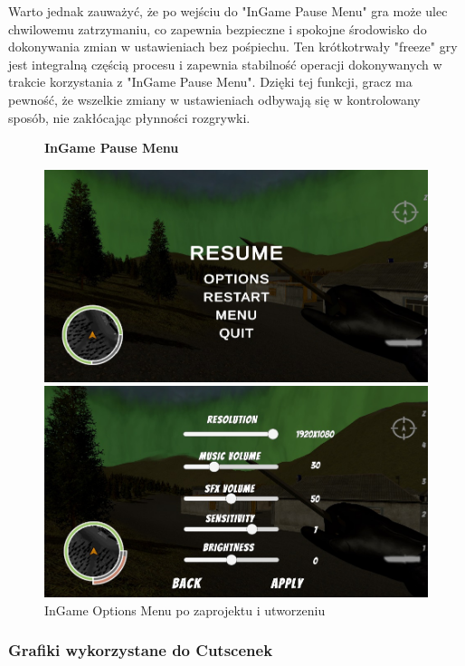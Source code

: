 Warto jednak zauważyć, że po wejściu do "InGame Pause Menu" gra może ulec chwilowemu zatrzymaniu, co zapewnia bezpieczne i spokojne środowisko do dokonywania zmian w ustawieniach bez pośpiechu. Ten krótkotrwały "freeze" gry jest integralną częścią procesu i zapewnia stabilność operacji dokonywanych w trakcie korzystania z "InGame Pause Menu". Dzięki tej funkcji, gracz ma pewność, że wszelkie zmiany w ustawieniach odbywają się w kontrolowany sposób, nie zakłócając płynności rozgrywki.

\begin{figure}[h]
\begin{center}
{\bfseries InGame Pause Menu}
\end{center}
    \centering
    \includegraphics[width=1\linewidth]{Images/InGamePauseMenu1.jpg}
        \caption{InGame Pause Menu po zaprojektu i utworzeniu}
    \includegraphics[width=1\linewidth]{Images/InGamePauseMenu2.jpg}
    \caption{InGame Options Menu po zaprojektu i utworzeniu}
\end{figure}
\FloatBarrier

\subsubsection{Grafiki wykorzystane do Cutscenek}

